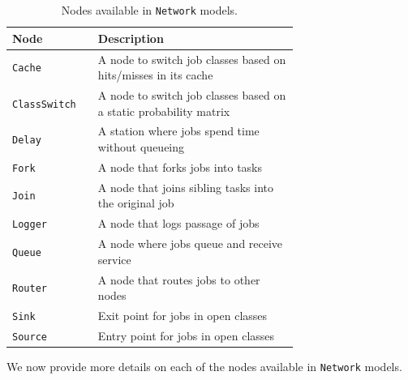 \begin{table}[t]
\renewcommand{\arraystretch}{1.2}
\centering
\caption{Nodes available in \texttt{Network} models.}
\begin{tabular}{|l|p{0.7\linewidth}|}
\hline
{Node} & {Description} \\
\hline
\texttt{Cache} & A node to switch job classes based on hits/misses in its cache\\
\texttt{ClassSwitch} & A node to switch job classes based on a static probability matrix\\
\texttt{Delay} & A station where jobs spend time without queueing\\
\texttt{Fork}\index{Fork|see{Network models}} & A node that forks jobs into tasks\\
\texttt{Join}\index{Join|see{Network models}} & A node that joins sibling tasks into the original job\\
\texttt{Logger} & A node that logs passage of jobs\\
\texttt{Queue} & A node where jobs queue and receive service\\
\texttt{Router} & A node that routes jobs to other nodes\\
\texttt{Sink} & Exit point for jobs in open classes\\
\texttt{Source} & Entry point for jobs in open classes\\
\hline
\end{tabular}
\label{TAB_nodes}
\end{table}


We now provide more details on each of the nodes available in \texttt{Network} models.
